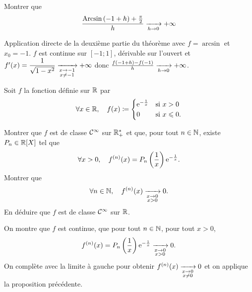 \documentclass{magnolia}
\begin{document}
\begin{exos}
\exo Montrer que
  \[\frac{\operatorname{Arcsin}\left(-1+h\right)+\frac{\pi}{2}}{h}\xrightarrow[h\rightarrow 0]{}+\infty\]
  \begin{sol}
    Application directe de la deuxième partie du théorème avec $f=\arcsin$ et $x_0=-1$.
    $f$ est continue sur $[-1;1]$, dérivable sur l'ouvert et $f'(x)=\dfrac{1}{\sqrt{1-x^2}}\xrightarrow[ \substack{x\rightarrow -1 \\ x\not=-1}]{}+\infty$ donc $\frac{f(-1+h)-f(-1)}{h}\xrightarrow[h\rightarrow 0]{}+\infty$.
    \end{sol}
\exo Soit $f$ la fonction définie sur $\mathbb{R}$ par
  \[\forall x\in\mathbb{R} ,\quad f(x)\coloneqq
    \begin{cases}
    {\rm e}^{-\frac{1}{x}} & \text{si $x> 0$}\\
    0 & \text{si $x\leqslant 0$.}
    \end{cases}\]
  \begin{questions}
\question Montrer que $f$ est de classe $\mathcal{C}^{\infty}$ sur $\mathbb{R}_+^*$ et que, pour tout $n\in\mathbb{N}$, existe
  $P_n\in\polyR$ tel que
  \[\forall x>0,\quad f^{(n)}(x)=P_n\left(\frac{1}{x}\right){\rm e}^{-\frac{1}{x}}.\]
\question Montrer que
  \[\forall n\in\mathbb{N},\quad f^{(n)}(x)\xrightarrow[ \substack{x\rightarrow 0 \\ x>0}]{}0.\]
\question En déduire que $f$ est de classe $\mathcal{C}^{\infty}$ sur $\mathbb{R}$.
  \end{questions}
  \begin{sol}
    On montre que $f$ est continue, que pour tout $n\in \mathbb{N}$, pour tout $x>0$, $$f^{(n)}(x)=P_n\left(\frac{1}{x}\right){\rm e}^{-\frac{1}{x}}\xrightarrow[ \substack{x\rightarrow 0 \\ x>0}]{}0.$$ On complète avec la limite à gauche pour obtenir $f^{(n)}(x)\xrightarrow[ \substack{x\rightarrow 0 \\ x\not=0}]{}0$ et on applique la proposition précédente.
    \end{sol}
\end{exos}
\end{document}
